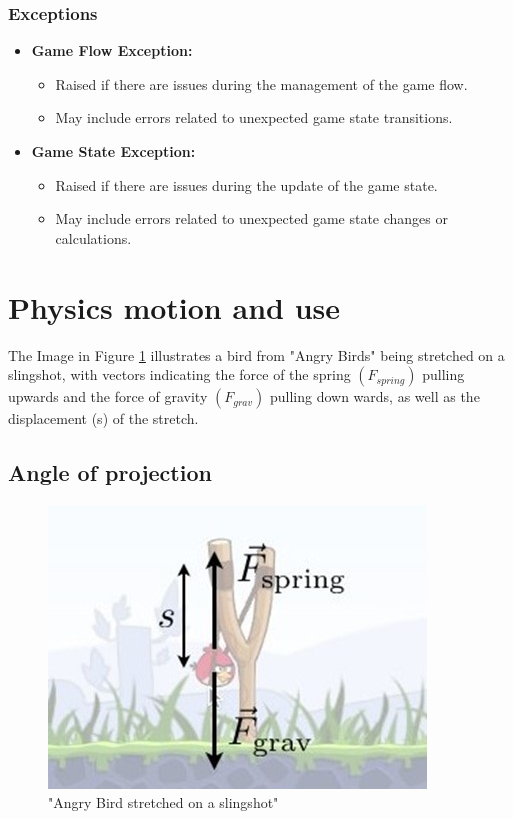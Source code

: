 \documentclass[12pt, titlepage]{article}
\begin{document}
\subsubsection{Exceptions}
\begin{itemize}
  \item \textbf{Game Flow Exception:}
    \begin{itemize}
  \item Raised if there are issues during the management of the game flow.
  \item May include errors related to unexpected game state transitions.
    \end{itemize}
  \item \textbf{Game State Exception:}
    \begin{itemize}
  \item Raised if there are issues during the update of the game state.
  \item May include errors related to unexpected game state changes or calculations.
    \end{itemize}
\end{itemize}

\section{Physics motion and use}

The Image in Figure \ref{fig:FIG1} illustrates a bird from "Angry Birds" being stretched on a slingshot, with vectors indicating the force of the spring $(F_{spring})$  pulling upwards and the force of gravity $(F_{grav})$ pulling down wards, as well as the displacement (s) of the stretch.


   
\subsection{Angle of projection}

\begin{figure}[!h]
    \centering
    \includegraphics[scale=1.3]{Picture1.jpg} 
    \caption{"Angry Bird stretched on a slingshot"}
 \label{fig:FIG1}
\end{figure}
\end{document}
